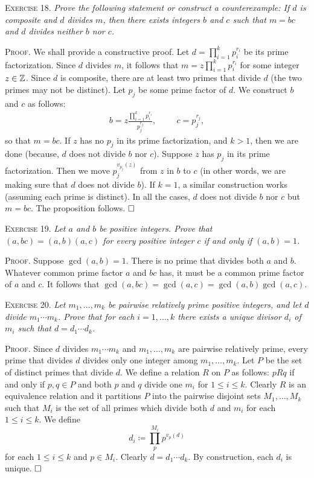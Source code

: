 \documentclass[11pt, leqno]{article}
\newcommand{\done}{\ensuremath{\hfill\square}}
\begin{document}
\textsc{Exercise 18}. \emph{Prove the following statement or construct a counterexample: If $d$ is composite and $d$ divides $m$, then there exists integers $b$ and $c$ such that $m=bc$ and $d$ divides neither $b$ nor $c$.}

\textsc{Proof}. We shall provide a constructive proof. Let $d = \prod_{i=1}^k p_i^{r_i}$ be its prime factorization. Since $d$ divides $m$, it follows that $m = z \prod_{i=1}^k p_i^{r_i}$ for some integer $z\in \mathbb{Z}$. Since $d$ is composite, there are at least two primes that divide $d$ (the two primes may not be distinct). Let $p_j$ be some prime factor of $d$. We construct $b$ and $c$ as follows: 
\begin{align*}
b = z \frac{\prod_{i=1}^k p_i^{r_i}}{ p_j^{r_j}}, \hspace{1cm} c = p_j^{r_j},
\end{align*}
so that $m = bc$. If $z$ has no $p_j$ in its prime factorization, and $k>1$, then we are done (because, $d$ does not divide $b$ nor $c$). Suppose $z$ has $p_j$ in its prime factorization. Then we move $p_j^{v_{p_j}(z)}$ from $z$ in $b$ to $c$ (in other words, we are making sure that $d$ does not divide $b$). If $k=1$, a similar construction works (assuming each prime is distinct). In all the cases, $d$ does not divide $b$ nor $c$ but $m = bc$. The proposition follows. \done

\textsc{Exercise 19}. \emph{Let $a$ and $b$ be positive integers. Prove that $(a,bc) = (a,b)(a,c)$ for every positive integer $c$ if and only if $(a,b)=1$.}

\textsc{Proof}. Suppose $\gcd(a,b) = 1$. There is no prime that divides both $a$ and $b$. Whatever common prime factor $a$ and $bc$ has, it must be a common prime factor of $a$ and $c$. It follows that $\gcd(a, bc) = \gcd(a, c) = \gcd(a,b) \gcd(a, c)$.

\textsc{Exercise 20}. \emph{Let $m_1, \ldots, m_k$ be pairwise relatively prime positive integers, and let $d$ divide $m_1\cdots m_k$. Prove that for each $i = 1, \ldots, k$ there exists a unique divisor $d_i$ of $m_i$ such that $d= d_1\cdots d_k$.}

\textsc{Proof}. Since $d$ divides $m_1\cdots m_k$ and $m_1, \ldots, m_k$ are pairwise relatively prime, every prime that divides $d$ divides only one integer among $m_1, \ldots, m_k$. Let $P$ be the set of distinct primes that divide $d$. We define a relation $R$ on $P$ as follows: $pRq$ if and only if $p,q\in P$ and both $p$ and $q$ divide one $m_i$ for $1\leq i \leq k$. Clearly $R$ is an equivalence relation and it partitions $P$ into the pairwise disjoint sets $M_1, \ldots, M_k$ such that $M_i$ is the set of all primes which divide both $d$ and $m_i$ for each $1 \leq i \leq k$. We define 
\begin{displaymath}
d_i \coloneqq \prod_p^{M_i} p^{v_p(d)}
\end{displaymath}
for each $1 \leq i \leq k$ and $p\in M_i$. Clearly $d = d_1\cdots d_k$. By construction, each $d_i$ is unique. \done
\end{document}
